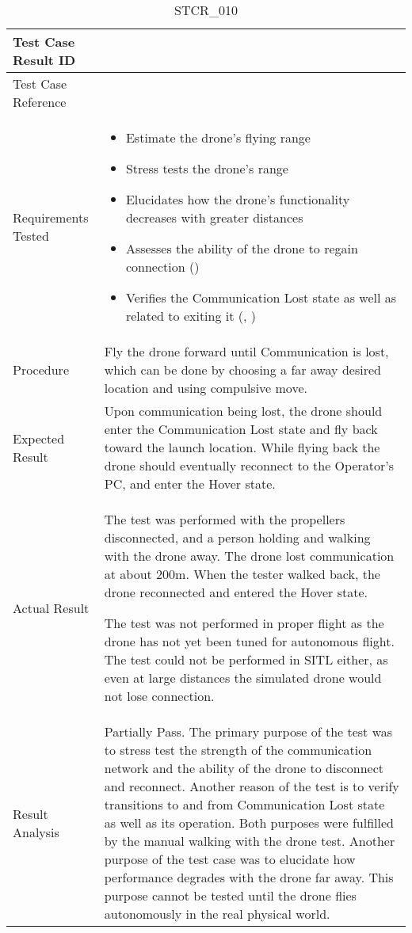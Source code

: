 \documentclass[12pt, titlepage]{article}
\begin{document}
\begin{table}[!h]
\begin{center}
\caption {STCR\_010}
\label{tab:STCR_010}
\begin{tabular}{ | m{3.2cm} | m{12.2cm} | } 
\hline
Test Case Result ID & \nameref{tab:STCR_010} \\ 
\hline
Test Case Reference & \nameref{tab:STC_010}  \\ 
\hline
Requirements Tested & 
\begin{itemize}
    \item Estimate the drone's flying range
    \item Stress tests the drone's range
    \item Elucidates how the drone's functionality decreases with greater distances
    \item Assesses the ability of the drone to regain connection (\nameref{SR_007})
    \item Verifies the Communication Lost state as well as related to exiting it (\nameref{STA_010}, \nameref{TRANS_010})

\end{itemize}
\\ 
\hline
Procedure & Fly the drone forward until Communication is lost, which can be done by choosing a far away desired location and using compulsive move.   \\
\hline
Expected Result & Upon communication being lost, the drone should enter the Communication Lost state and fly back toward the launch location. While flying back the drone should eventually reconnect to the Operator's PC, and enter the Hover state.    \\ 
\hline
Actual Result & The test was performed with the propellers disconnected, and a person holding and walking with the drone away. The drone lost communication at about 200m. When the tester walked back, the drone reconnected and entered the Hover state. 

The test was not performed in proper flight as the drone has not yet been tuned for autonomous flight. The test could not be performed in SITL either, as even at large distances the simulated drone would not lose connection.  \\
\hline
Result Analysis & Partially Pass. The primary purpose of the test was to stress test the strength of the communication network and the ability of the drone to disconnect and reconnect. Another reason of the test is to verify transitions to and from Communication Lost state as well as its operation. Both purposes were fulfilled by the manual walking with the drone test. Another purpose of the test case was to elucidate how performance degrades with the drone far away. This purpose cannot be tested until the drone flies autonomously in the real physical world.  \\ 
\hline
\end{tabular}
\end{center}
\end{table}
\end{document}
